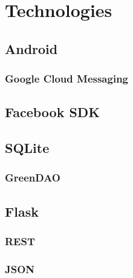 \chapter{Technologies}

\section{Android}

\subsection{Google Cloud Messaging}

\section{Facebook SDK}

\section{SQLite}

\subsection{GreenDAO}

\section{Flask}

\subsection{REST}

\subsection{JSON}